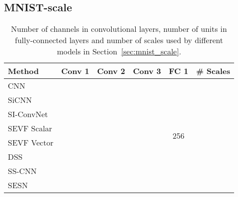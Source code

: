 \documentclass{article} \usepackage{multirow}
\def\Secref#1{Section~\ref{#1}}
\begin{document}
\subsection{MNIST-scale}
\begin{table}[h]
    \begin{center}
    \begin{tabular}{l|cccc|c}
    \toprule
    Method                & Conv 1 & Conv 2 & Conv 3 & FC 1                 & \multicolumn{1}{c}{\# Scales}              \\ 
    \midrule
    CNN                   &      &      &      & \multirow{8}{*}{256} &                                                \\
    SiCNN                 &      &      &      &                      &         \\
    SI-ConvNet                &      &      &      &                      &         \\
    SEVF Scalar           &      &      &      &                      &      \\
    SEVF Vector           &      &      &      &                      &      \\
    DSS                   &      &      &      &                      &                    \\
    SS-CNN                &      &      &      &                      &                                                 \\
    SESN                  &      &      &      &                      &                                               \\       
    \bottomrule                             
    \end{tabular}
    \end{center}
    \caption{Number of channels in convolutional layers, number of units in fully-connected layers 
    and number of scales used by different models in \Secref{sec:mnist_scale}.}
    \label{tab:appendix_arch_mnist}
\end{table}
\end{document}
